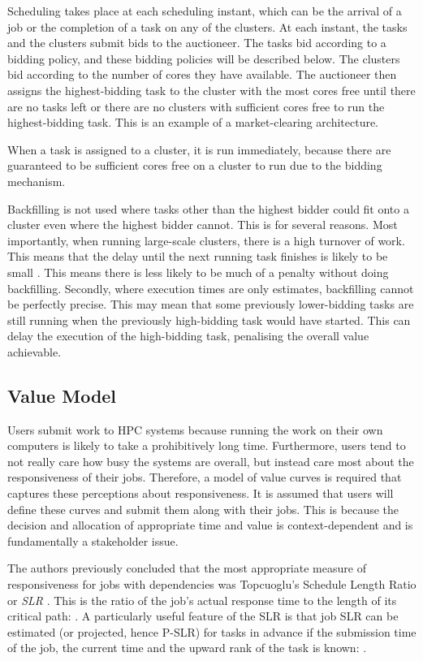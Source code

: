 \documentclass[english,british]{IEEEtran}
\begin{document}
Scheduling takes place at each scheduling instant, which can be the
arrival of a job or the completion of a task on any of the clusters.
At each instant, the tasks and the clusters submit bids to the auctioneer.
The tasks bid according to a bidding policy, and these bidding policies
will be described below. The clusters bid according to the number
of cores they have available. The auctioneer then assigns the highest-bidding
task to the cluster with the most cores free until there are no tasks
left or there are no clusters with sufficient cores free to run the
highest-bidding task. This is an example of a market-clearing architecture.

When a task is assigned to a cluster, it is run immediately, because
there are guaranteed to be sufficient cores free on a cluster to run
due to the bidding mechanism.

Backfilling is not used where tasks other than the highest bidder
could fit onto a cluster even where the highest bidder cannot. This
is for several reasons. Most importantly, when running large-scale
clusters, there is a high turnover of work. This means that the delay
until the next running task finishes is likely to be small \cite{burkimsher14}.
This means there is less likely to be much of a penalty without doing
backfilling. Secondly, where execution times are only estimates, backfilling
cannot be perfectly precise. This may mean that some previously lower-bidding
tasks are still running when the previously high-bidding task would
have started. This can delay the execution of the high-bidding task,
penalising the overall value achievable.


\subsection{Value Model}

Users submit work to HPC systems because running the work on their
own computers is likely to take a prohibitively long time. Furthermore,
users tend to not really care how busy the systems are overall, but
instead care most about the responsiveness of their jobs. Therefore,
a model of value curves is required that captures these perceptions
about responsiveness. It is assumed that users will define these curves
and submit them along with their jobs. This is because the decision
and allocation of appropriate time and value is context-dependent
and is fundamentally a stakeholder issue.

The authors previously concluded \cite{burkimsher12} that the most
appropriate measure of responsiveness for jobs with dependencies was
Topcuoglu's Schedule Length Ratio or \emph{SLR} \cite{Topcuoglu2002}.
This is the ratio of the job's actual response time to the length
of its critical path: .
A particularly useful feature of the SLR is that job SLR can be estimated
(or projected, hence P-SLR) for tasks in advance if the submission
time of the job, the current time and the upward rank of the task
is known: .
\end{document}

